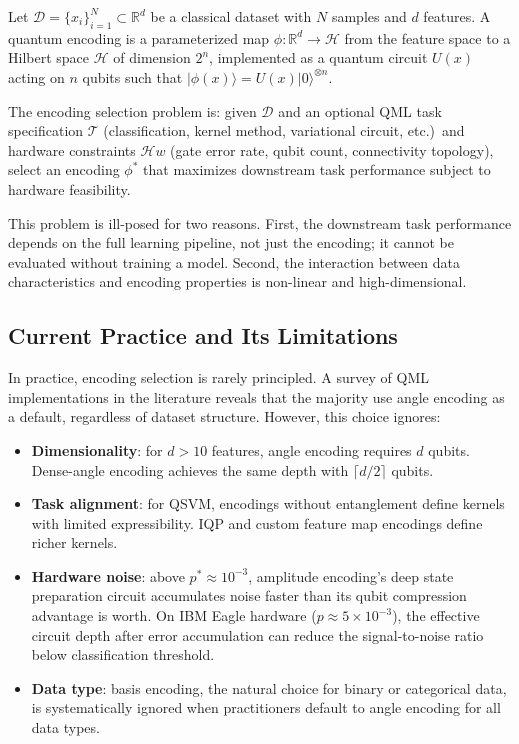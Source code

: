 \documentclass[sigconf,nonacm]{acmart}
\begin{document}
Let $\mathcal{D} = \{x_i\}_{i=1}^N \subset \mathbb{R}^d$ be a classical dataset
with $N$ samples and $d$ features. A quantum encoding is a parameterized map
$\phi: \mathbb{R}^d \rightarrow \mathcal{H}$ from the feature space to a Hilbert
space $\mathcal{H}$ of dimension $2^n$, implemented as a quantum circuit $U(x)$
acting on $n$ qubits such that $|\phi(x)\rangle = U(x)|0\rangle^{\otimes n}$.

The encoding selection problem is: given $\mathcal{D}$ and an optional QML task
specification $\mathcal{T}$ (classification, kernel method, variational circuit,
etc.)\ and hardware constraints $\mathcal{H}\!w$ (gate error rate, qubit count,
connectivity topology), select an encoding $\phi^{*}$ that maximizes downstream task
performance subject to hardware feasibility.

This problem is ill-posed for two reasons. First, the downstream task performance
depends on the full learning pipeline, not just the encoding; it cannot be evaluated
without training a model. Second, the interaction between data characteristics and
encoding properties is non-linear and high-dimensional.

\subsection{Current Practice and Its Limitations}

In practice, encoding selection is rarely principled. A survey of QML
implementations in the literature reveals that the majority use angle encoding as a
default, regardless of dataset structure. However, this choice ignores:

\begin{itemize}
  \item \textbf{Dimensionality}: for $d > 10$ features, angle encoding requires $d$
    qubits. Dense-angle encoding achieves the same depth with $\lceil d/2 \rceil$
    qubits.

  \item \textbf{Task alignment}: for QSVM, encodings without entanglement define
    kernels with limited expressibility. IQP and custom feature map encodings define
    richer kernels.

  \item \textbf{Hardware noise}: above $p^{*} \approx 10^{-3}$, amplitude encoding's
    deep state preparation circuit accumulates noise faster than its qubit compression
    advantage is worth. On IBM Eagle hardware ($p \approx 5 \times 10^{-3}$), the
    effective circuit depth after error accumulation can reduce the signal-to-noise
    ratio below classification threshold.

  \item \textbf{Data type}: basis encoding, the natural choice for binary or
    categorical data, is systematically ignored when practitioners default to angle
    encoding for all data types.
\end{itemize}
\end{document}
